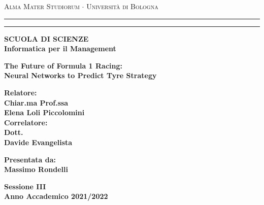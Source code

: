 \documentclass[12pt,a4paper, openright, twoside]{report}
\begin{document}
\begin{titlepage}
\begin{center}
{{\Large{\textsc{Alma Mater Studiorum $\cdot$ Universit\`a di
Bologna}}}} \rule[0.1cm]{15.8cm}{0.1mm}
\rule[0.5cm]{15.8cm}{0.6mm}
{\small{\bf SCUOLA DI SCIENZE\\
Informatica per il Management}}
\end{center}
\vspace{15mm}
\begin{center} %
{\LARGE{\bf The Future of Formula 1 Racing:}}\vspace{1mm}\\
{\LARGE{\bf  Neural Networks to Predict Tyre Strategy}}\\
\end{center}
\vspace{40mm}
\par
\noindent
\begin{minipage}[t]{0.47\textwidth}
{\large{\bf Relatore:\\
Chiar.ma Prof.ssa\\
Elena Loli Piccolomini}} \\
{\large{\bf Correlatore:\\
Dott.\\
Davide Evangelista}}
\end{minipage}
\hfill
\begin{minipage}[t]{0.47\textwidth}\raggedleft
{\large{\bf Presentata da:\\
Massimo Rondelli}}
\end{minipage}
\vspace{20mm}
\begin{center}
{\large{\bf Sessione III\\%
Anno Accademico 2021/2022}}%
\end{center}
\end{titlepage}

\tableofcontents


% 
\end{document}
